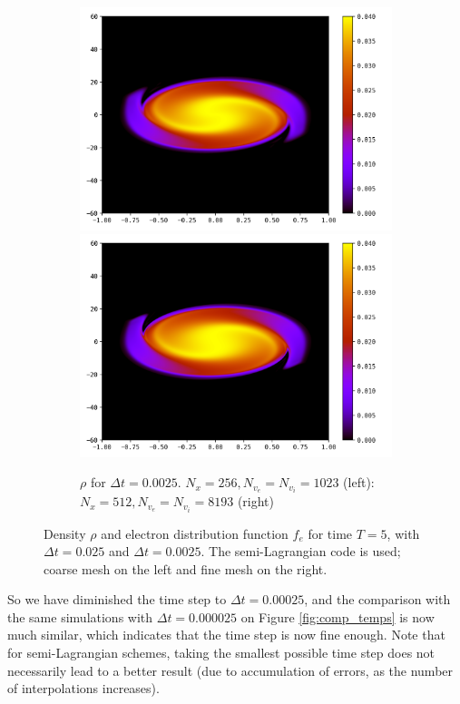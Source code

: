 \documentclass{article}
\numberwithin{equation}{section}
\newcommand{\mysubcaption}[1]{
	\vspace*{5pt}
	\begin{minipage}{0.8\linewidth}
		\begin{center}
			\footnotesize\emph{#1}
		\end{center}
	\end{minipage}
}
\newcommand{\imh}{\textheight} %
\begin{document}
\begin{figure}
	\begin{subfigure}{\textwidth}
		\centering
		\includegraphics[height=\imh,width=0.45\linewidth]{images/feT5_run5n.png}
		\includegraphics[height=\imh,width=0.45\linewidth]{images/feT5_run5z.png}
		\caption{$\rho$ for $\Delta t=0.0025$. $N_x=256, N_{v_e}=N_{v_i}=1023$ (left): $N_x=512  , N_{v_e}=N_{v_i} = 8193$ (right)}
	\end{subfigure}



	\caption{Density $\rho$ and electron distribution function $f_e$ for time $T=5$, with $\Delta t=0.025$ and $\Delta t = 0.0025$. 
	 The semi-Lagrangian code is used; coarse mesh on the left and fine mesh on the right.
	}
	\label{fig:comp_temps2}
\end{figure}  


So we have diminished the time step to $\Delta t = 0.00025$, and the comparison with the same simulations with  $\Delta t = 0.000025$ on Figure \ref{fig:comp_temps} 
is now much similar, which indicates that the 
time step is now fine enough. Note that for semi-Lagrangian schemes, taking the smallest possible time step does not necessarily lead to a better result (due to accumulation of errors, as the number of interpolations 
increases).
\end{document}
